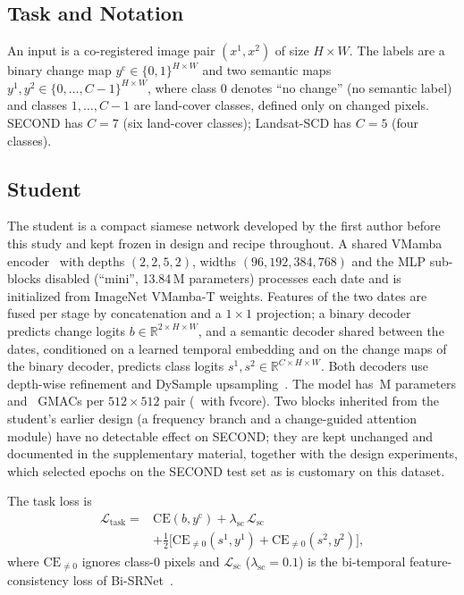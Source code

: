\documentclass[journal]{IEEEtran}
\begin{document}
\subsection{Task and Notation}
An input is a co-registered image pair $(x^{1},x^{2})$ of size $H\times W$. The labels are a
binary change map $y^{\mathrm{c}}\in\{0,1\}^{H\times W}$ and two semantic maps
$y^{1},y^{2}\in\{0,\dots,C-1\}^{H\times W}$, where class $0$ denotes ``no change'' (no
semantic label) and classes $1,\dots,C-1$ are land-cover classes, defined only on changed
pixels. SECOND has $C=7$ (six land-cover classes); Landsat-SCD has $C=5$ (four classes).

\subsection{Student}
\label{sec:student}
The student is a compact siamese network developed by the first author before this study and
kept frozen in design and recipe throughout. A shared VMamba encoder~\cite{liu2024vmamba} with
depths $(2,2,5,2)$, widths $(96,192,384,768)$ and the MLP sub-blocks disabled (``mini'',
\num{13.84}\,M parameters) processes each date and is initialized from ImageNet VMamba-T
weights. Features of the two dates are fused per stage by concatenation and a $1\times1$
projection; a binary decoder predicts change logits $b\in\mathbb{R}^{2\times H\times W}$, and
a semantic decoder shared between the dates, conditioned on a learned temporal embedding and
on the change maps of the binary decoder, predicts class logits $s^{1},s^{2}\in\mathbb{R}^{C
\times H\times W}$. Both decoders use depth-wise refinement and DySample
upsampling~\cite{liu2023upsample}. The model has \StudentParams\,M parameters and
\StudentGmacs\ GMACs per $512\times512$ pair (\StudentGmacsFvcore\ with fvcore).
Two blocks inherited from the student's earlier design (a frequency branch and a change-guided
attention module) have no detectable effect on SECOND; they are kept unchanged and documented in the
supplementary material, together with the design experiments, which selected epochs on the
SECOND test set as is customary on this dataset.

The task loss is
\begin{equation}
\begin{split}
\mathcal{L}_{\mathrm{task}} ={}& \mathrm{CE}(b,y^{\mathrm{c}})
 + \lambda_{\mathrm{sc}}\,\mathcal{L}_{\mathrm{sc}}\\
 &+ \tfrac12\big[\mathrm{CE}_{\neq0}(s^{1},y^{1})+\mathrm{CE}_{\neq0}(s^{2},y^{2})\big],
\end{split}
\label{eq:task}
\end{equation}
where $\mathrm{CE}_{\neq0}$ ignores class-0 pixels and $\mathcal{L}_{\mathrm{sc}}$
($\lambda_{\mathrm{sc}}=0.1$) is the bi-temporal feature-consistency loss of
Bi-SRNet~\cite{ding2022bi}.
\end{document}
